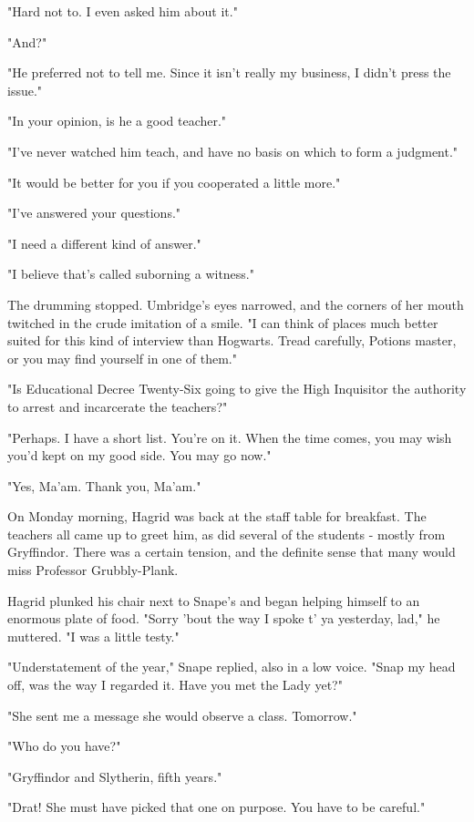 "Hard not to. I even asked him about it."

"And?"

"He preferred not to tell me. Since it isn't really my business, I didn't press the issue."

"In your opinion, is he a good teacher."

"I've never watched him teach, and have no basis on which to form a judgment."

"It would be better for you if you cooperated a little more."

"I've answered your questions."

"I need a different kind of answer."

"I believe that's called suborning a witness."

The drumming stopped. Umbridge's eyes narrowed, and the corners of her mouth twitched in the crude imitation of a smile. "I can think of places much better suited for this kind of interview than Hogwarts. Tread carefully, Potions master, or you may find yourself in one of them."

"Is Educational Decree Twenty-Six going to give the High Inquisitor the authority to arrest and incarcerate the teachers?"

"Perhaps. I have a short list. You're on it. When the time comes, you may wish you'd kept on my good side. You may go now."

"Yes, Ma'am. Thank you, Ma'am."

On Monday morning, Hagrid was back at the staff table for breakfast. The teachers all came up to greet him, as did several of the students - mostly from Gryffindor. There was a certain tension, and the definite sense that many would miss Professor Grubbly-Plank.

Hagrid plunked his chair next to Snape's and began helping himself to an enormous plate of food. "Sorry 'bout the way I spoke t' ya yesterday, lad," he muttered. "I was a little testy."

"Understatement of the year," Snape replied, also in a low voice. "Snap my head off, was the way I regarded it. Have you met the Lady yet?"

"She sent me a message she would observe a class. Tomorrow."

"Who do you have?"

"Gryffindor and Slytherin, fifth years."

"Drat! She must have picked that one on purpose. You have to be careful."

